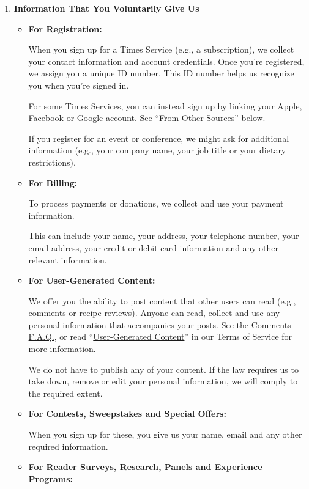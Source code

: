 \begin{enumerate}
\def\labelenumi{\arabic{enumi}.}
\tightlist
\item
  \textbf{Information That You Voluntarily Give Us}

  \begin{itemize}
  \item
    \textbf{For Registration:}

    When you sign up for a Times Service (e.g., a subscription), we
    collect your contact information and account credentials. Once
    you're registered, we assign you a unique ID number. This ID number
    helps us recognize you when you're signed in.

    For some Times Services, you can instead sign up by linking your
    Apple, Facebook or Google account. See
    ``\protect\hyperlink{anchor-question1-sectionB}{From Other
    Sources}'' below.

    If you register for an event or conference, we might ask for
    additional information (e.g., your company name, your job title or
    your dietary restrictions).
  \item
    \textbf{For Billing:}

    To process payments or donations, we collect and use your payment
    information.

    This can include your name, your address, your telephone number,
    your email address, your credit or debit card information and any
    other relevant information.
  \item
    \textbf{For User-Generated Content:}

    We offer you the ability to post content that other users can read
    (e.g., comments or recipe reviews). Anyone can read, collect and use
    any personal information that accompanies your posts. See the
    \href{https://help.nytimes.com/hc/en-us/articles/115014792387-Comments}{Comments
    F.A.Q.}, or read
    ``\href{https://help.nytimes.com/hc/en-us/articles/115014893428-Terms-of-service\#3}{User-Generated
    Content}'' in our Terms of Service for more information.

    We do not have to publish any of your content. If the law requires
    us to take down, remove or edit your personal information, we will
    comply to the required extent.
  \item
    \textbf{For Contests, Sweepstakes and Special Offers:}

    When you sign up for these, you give us your name, email and any
    other required information.
  \item
    \textbf{For Reader Surveys, Research, Panels and Experience
    Programs:}


\end{itemize}
\end{enumerate}
